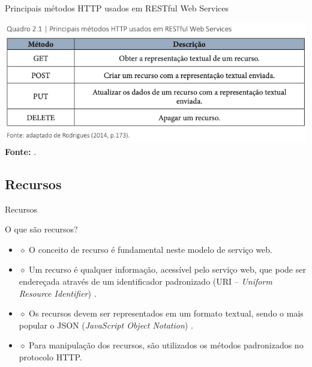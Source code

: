 \documentclass{beamer}
\begin{document}
\begin{frame}{Principais métodos HTTP usados em RESTful Web Services}
\begin{center}
   \includegraphics[width=0.95\linewidth]{fig/aula5/aula5_1.png}\\
   \tiny{\textbf{Fonte: } \cite{malheiros2019cc}.}
\end{center}
    
\end{frame}
\subsection{Recursos}
\begin{frame}{Recursos}
    \begin{exampleblock}{O que são recursos?}    	           \begin{itemize}
	    \item $\diamond$ O conceito de recurso é fundamental neste modelo de serviço web. 
	    \item $\diamond$ Um recurso é qualquer informação, acessível pelo serviço web, que pode ser endereçada através de um identificador padronizado (URI – \textit{Uniform Resource Identifier}) \cite{tanembaum2007sd}. 
	    \item $\diamond$ Os recursos devem ser representados em um formato textual, sendo o mais popular o JSON (\textit{JavaScript Object Notation}) \cite{nodejs2022api}. 
	    \item $\diamond$ Para manipulação dos recursos, são utilizados os métodos padronizados no protocolo HTTP. 
	\end{itemize}
    \end{exampleblock}
\end{frame}
\end{document}
